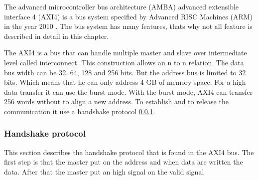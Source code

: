  
The  advanced microcontroller bus architecture (AMBA) advanced extensible interface 4 (AXI4) is a bus system specified by Advanced RISC Machines (ARM) in the year 2010 \cite{6129797}. The bus system has many features, thats why not all feature is described in detail in this chapter.

The AXI4 is a bus that can handle multiple master and slave over intermediate level called interconnect. This construction allows an n to n relation. The data bus width can be 32, 64, 128 and 256 bits. But the address bus is limited to 32 bits. Which means that he can only address 4 GB of memory space. For a high data transfer it can use the burst mode. With the burst mode, AXI4 can transfer 256 words without to align a new address. To establish and to release the communication it use a handshake protocol \cref{section:handshake}\cite{6129797}. 

\subsubsection{Handshake protocol}
\label{section:handshake}
This section describes the handshake protocol that is found in the AXI4 bus. The first step is that the master put on the address and when data are written the data. After that the master put an high signal on the valid signal

